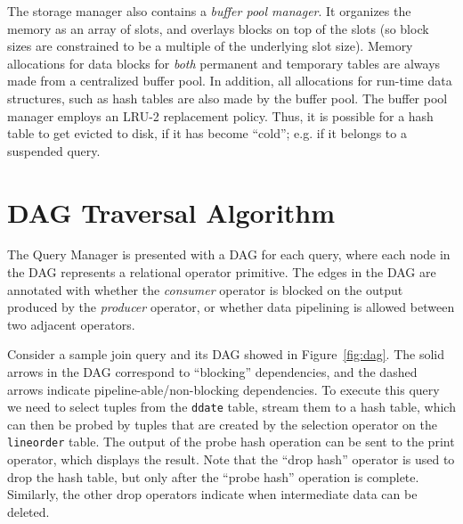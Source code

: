 The storage manager also contains a \textit{buffer pool manager}. 
It organizes the memory as an array of slots, and overlays blocks on top of the slots (so block sizes are constrained to be a multiple of the underlying slot size). 
Memory allocations for data blocks for \textit{both} permanent and temporary tables are always made from a centralized buffer pool. 
In addition, all allocations for run-time data structures, such as hash tables are also made 
by the buffer pool. 
The buffer pool manager employs an LRU-2 replacement policy. 
Thus, it is possible for a hash table to get evicted to disk, if it has become ``cold''; e.g. if it belongs to a suspended query.

\section{DAG Traversal Algorithm}\label{apx:DAG-algo}
The Query Manager is presented with a DAG for each query, where each
node in the DAG represents a relational operator primitive.
The edges in the DAG are annotated with whether the 
\textit{consumer} operator is blocked on the output produced 
by the \textit{producer} operator, or whether data pipelining is
allowed between two adjacent operators. 

Consider a sample join query and its DAG showed in Figure~\ref{fig:dag}.
The solid arrows in the DAG correspond to ``blocking'' dependencies,
and the dashed arrows indicate pipeline-able/non-blocking dependencies. 
To execute this query we need to select tuples from the \verb+ddate+ 
table, stream them to a hash table, which can then be probed by tuples that are 
created by the selection operator on the \verb+lineorder+ table. %
The output of the probe hash operation can be sent to the print operator, which
displays the result. %
Note that the ``drop hash'' operator is used to drop the hash table, but only 
after the ``probe hash'' operation is complete. 
Similarly, the other drop operators indicate when intermediate data can be deleted. 

